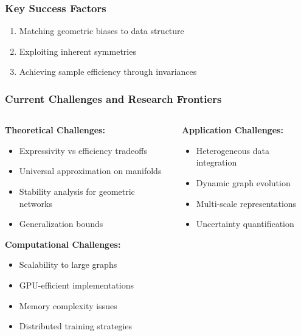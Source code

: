 \begin{frame}[fragile]\frametitle{Key Success Factors}

\begin{enumerate}
\item Matching geometric biases to data structure
\item Exploiting inherent symmetries
\item Achieving sample efficiency through invariances
\end{enumerate}

\end{frame}

\begin{frame}[fragile]\frametitle{Current Challenges and Research Frontiers}

\begin{columns}
\begin{column}{0.5\textwidth}
\textbf{Theoretical Challenges:}
\begin{itemize}
\item Expressivity vs efficiency tradeoffs
\item Universal approximation on manifolds
\item Stability analysis for geometric networks
\item Generalization bounds
\end{itemize}

\textbf{Computational Challenges:}
\begin{itemize}
\item Scalability to large graphs
\item GPU-efficient implementations
\item Memory complexity issues
\item Distributed training strategies
\end{itemize}
\end{column}
\begin{column}{0.5\textwidth}
\textbf{Application Challenges:}
\begin{itemize}
\item Heterogeneous data integration
\item Dynamic graph evolution
\item Multi-scale representations
\item Uncertainty quantification
\end{itemize}


\end{column}
\end{columns}
\end{frame}
